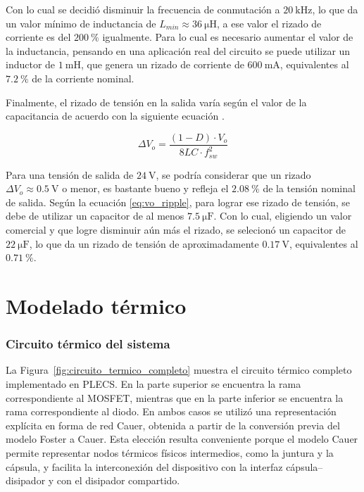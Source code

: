 \documentclass[journal]{IEEEtran}
\begin{document}
\setlength{\parskip}{1em}

Con lo cual se decidió disminuir la frecuencia de conmutación a $20~\mathrm{kHz}$, lo que da un valor mínimo de inductancia de $L_{min} \approx 36~\mathrm{\mu H}$, a ese valor
el rizado de corriente es del $200~\%$ igualmente. Para lo cual es necesario aumentar el valor de la inductancia, pensando en una aplicación real del circuito se puede utilizar
un inductor de $1~\mathrm{mH}$, que genera un rizado de corriente de $600 ~\mathrm{mA}$, equivalentes al $7.2~\%$ de la corriente nominal.

\setlength{\parskip}{1em}


Finalmente, el rizado de tensión en la salida varía según el valor de la capacitancia de acuerdo con la siguiente
ecuación \cite{hart2011power}.

\begin{equation}
    \Delta V_o = \frac{(1 - D) \cdot V_o}{8LC \cdot f_{sw}^2}
    \label{eq:vo_ripple}
\end{equation}

Para una tensión de salida de $24~\mathrm{V}$, se podría considerar que un rizado $\Delta V_o \approx 0.5~\mathrm{V}$ o menor, es bastante bueno y refleja el $2.08~\%$ de la tensión nominal de salida.
Según la ecuación \ref{eq:vo_ripple}, para lograr ese rizado de tensión, se debe de utilizar un capacitor de al menos $7.5 ~\mathrm{\mu F}$. Con lo cual, eligiendo un valor comercial y que
logre disminuir aún más el rizado, se selecionó un capacitor de $22~\mathrm{\mu F}$, lo que da un rizado de tensión de aproximadamente $0.17~\mathrm{V}$, equivalentes al $0.71~\%$.



\section{Modelado térmico}
\subsubsection{Circuito térmico del sistema}

La Figura~\ref{fig:circuito_termico_completo} muestra el circuito térmico completo implementado en PLECS. En la parte superior se encuentra la rama correspondiente al MOSFET, mientras que en la parte inferior se encuentra la rama correspondiente al diodo. En ambos casos se utilizó una representación explícita en forma de red Cauer, obtenida a partir de la conversión previa del modelo Foster a Cauer. Esta elección resulta conveniente porque el modelo Cauer permite representar nodos térmicos físicos intermedios, como la juntura y la cápsula, y facilita la interconexión del dispositivo con la interfaz cápsula--disipador y con el disipador compartido.
\end{document}

